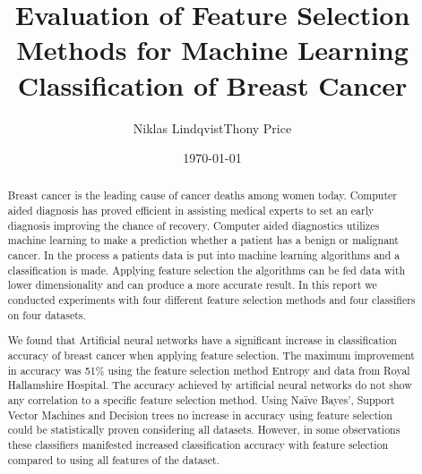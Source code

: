 \documentclass{kththesis}
\title{Evaluation of Feature Selection Methods for Machine Learning Classification of Breast Cancer}
\author{Niklas Lindqvist\newline Thony Price}
\date{\today}
\begin{document}

\frontmatter
\titlepage



\begin{abstract}

  Breast cancer is the leading cause of cancer deaths among women today. Computer aided diagnosis has proved efficient in assisting medical experts to set an early diagnosis improving the chance of recovery. Computer aided diagnostics utilizes machine learning to make a prediction whether a patient has a benign or malignant cancer. In the process a patients data is put into machine learning algorithms and a classification is made. Applying feature selection the algorithms can be fed data with lower dimensionality and can produce a more accurate result. In this report we conducted experiments with four different feature selection methods and four classifiers on four datasets.

  We found that Artificial neural networks have a significant increase in classification accuracy of breast cancer when applying feature selection. The maximum improvement in accuracy was 51\% using the feature selection method Entropy and data from Royal Hallamshire Hospital. The accuracy achieved by artificial neural networks do not show any correlation to a specific feature selection method. Using Naïve Bayes', Support Vector Machines and Decision trees no increase in accuracy using feature selection could be statistically proven considering all datasets. However, in some observations these classifiers manifested increased classification accuracy with feature selection compared to using all features of the dataset.

\end{abstract}


\end{document}
